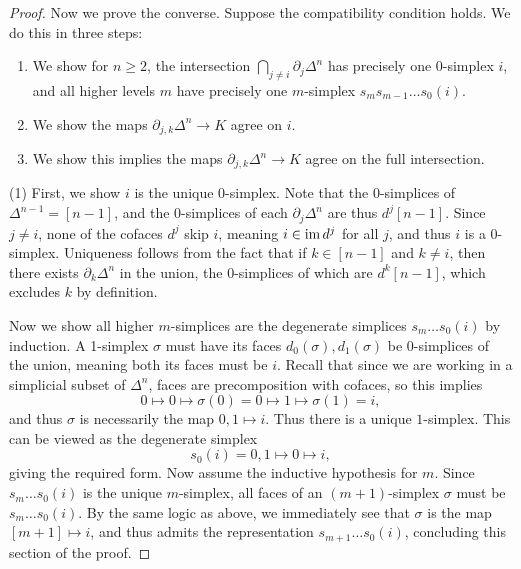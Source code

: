 \begin{proof}
	Now we prove the converse. Suppose the compatibility condition holds. We do this in three steps:
	\begin{enumerate}
		\item We show for $n\geq 2$, the intersection $\bigcap_{j\neq i} \partial _j\Delta ^{n} $ has precisely one 0-simplex $i$, and all higher levels $m$ have precisely one $m$-simplex $s_m s_{m-1} \ldots s_0(i)$.
		\item We show the maps $\partial _{j,k} \Delta ^{n} \to K$ agree on $i$.
		\item We show this implies the maps $\partial_{j,k} \Delta ^{n} \to K$ agree on the full intersection.
	\end{enumerate}
	
	(1) First, we show $i$ is the unique 0-simplex. Note that the 0-simplices of $\Delta ^{n-1} =[n-1]$, and the $0$-simplices of each $\partial _j\Delta ^{n} $ are thus $d^j[n-1]$. Since $j\neq i$, none of the cofaces $d^j$ skip $i$, meaning $i\in \operatorname{im} d^j$ for all $j$, and thus $i$ is a 0-simplex. Uniqueness follows from the fact that if $k\in[n-1]$ and $k\neq i$, then there exists $\partial _k\Delta ^{n} $ in the union, the 0-simplices of which are $d^k[n-1]$, which excludes $k$ by definition.

	Now we show all higher $m$-simplices are the degenerate simplices $s_m \ldots s_0(i)$ by induction. A 1-simplex $\sigma $ must have its faces $d_0(\sigma ),d_1(\sigma )$ be 0-simplices of the union, meaning both its faces must be $i$. Recall that since we are working in a simplicial subset of $\Delta ^n$, faces are precomposition with cofaces, so this implies
	\[
		0\mapsto 0\mapsto \sigma (0) = 0\mapsto 1 \mapsto \sigma (1) = i,
	\]
	and thus $\sigma $ is necessarily the map $0,1\mapsto i$. Thus there is a unique $1$-simplex. This can be viewed as the degenerate simplex
	\[
		s_0(i) = 0,1\mapsto 0\mapsto i
	,\]
	giving the required form. Now assume the inductive hypothesis for $m$. Since $s_m \ldots s_0(i)$ is the unique $m$-simplex, all faces of an $(m+1)$-simplex $\sigma $ must be $s_m \ldots s_0(i)$. By the same logic as above, we immediately see that $\sigma $ is the map $[m+1]\mapsto i$, and thus admits the representation $s_{m+1}  \ldots s_0(i)$, concluding this section of the proof.


\end{proof}
